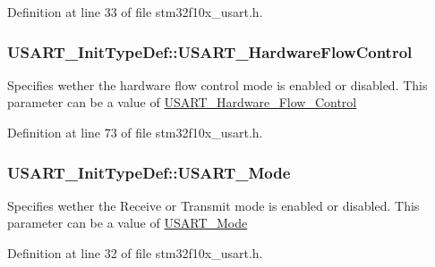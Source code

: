 Definition at line 33 of file stm32f10x\+\_\+usart.\+h.

\subsubsection[{\texorpdfstring{U\+S\+A\+R\+T\+\_\+\+Hardware\+Flow\+Control}{USART_HardwareFlowControl}}]{ U\+S\+A\+R\+T\+\_\+\+Init\+Type\+Def\+::\+U\+S\+A\+R\+T\+\_\+\+Hardware\+Flow\+Control}\hypertarget{struct_u_s_a_r_t___init_type_def_a9996edf3bfd90c36f03b4075969703f5}{}\label{struct_u_s_a_r_t___init_type_def_a9996edf3bfd90c36f03b4075969703f5}
Specifies wether the hardware flow control mode is enabled or disabled. This parameter can be a value of \hyperlink{group___u_s_a_r_t___hardware___flow___control}{U\+S\+A\+R\+T\+\_\+\+Hardware\+\_\+\+Flow\+\_\+\+Control} 

Definition at line 73 of file stm32f10x\+\_\+usart.\+h.

\subsubsection[{\texorpdfstring{U\+S\+A\+R\+T\+\_\+\+Mode}{USART_Mode}}]{ U\+S\+A\+R\+T\+\_\+\+Init\+Type\+Def\+::\+U\+S\+A\+R\+T\+\_\+\+Mode}\hypertarget{struct_u_s_a_r_t___init_type_def_ab4f2a4bab37b5c96876cc4a9435f2dd7}{}\label{struct_u_s_a_r_t___init_type_def_ab4f2a4bab37b5c96876cc4a9435f2dd7}
Specifies wether the Receive or Transmit mode is enabled or disabled. This parameter can be a value of \hyperlink{group___u_s_a_r_t___mode}{U\+S\+A\+R\+T\+\_\+\+Mode} 

Definition at line 32 of file stm32f10x\+\_\+usart.\+h.

